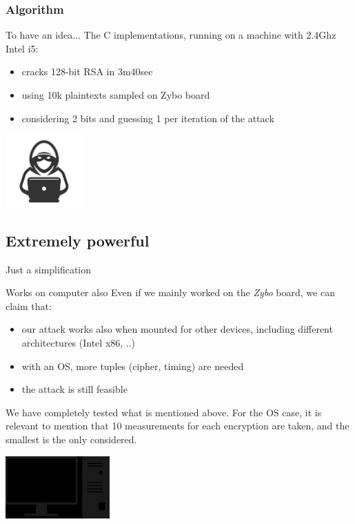 \documentclass{beamer}
\begin{document}
\begin{frame}[fragile]
    \frametitle{Algorithm}
    \begin{block}{To have an idea...}
        The C implementations, running on a machine with 2.4Ghz Intel i5:
        \begin{itemize}
            \pause \item cracks 128-bit RSA in 3m40sec
            \pause \item using 10k plaintexts sampled on Zybo board
            \pause \item considering 2 bits and guessing 1 per iteration of the attack
        \end{itemize}
    \end{block}
    \hfill \includegraphics[width=3cm]{./graphics/hacker}
\end{frame}

\subsection{Extremely powerful}
\begin{frame}{Just a simplification}
	\begin{block}{Works on computer also}
		Even if we mainly worked on the \textit{Zybo} board, we can claim that:
		\begin{itemize}
			\pause \item our attack works also when mounted for other devices, including different architectures (Intel x86, ..)
			\pause \item with an OS, more tuples (cipher, timing) are needed
			\pause \item the attack is still feasible
		\end{itemize}
    We have completely tested what is mentioned above. For the OS case, it is relevant to mention that 10 measurements for each encryption are taken, and the smallest is the only considered.
    \begin{center}
      \includegraphics[width=4cm]{./graphics/pc}
    \end{center}
	\end{block}
\end{frame}
\end{document}
